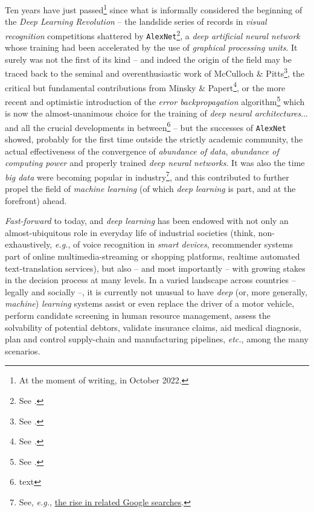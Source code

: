 

Ten years have just passed\footnote{At the moment of writing, in October 2022.} since what is informally considered the beginning of the \textit{Deep Learning Revolution} -- the landslide series of records in \textit{visual recognition} competitions shattered by \texttt{AlexNet}\footnote{See \cite{KrizhevskyEtAl2012AlexNet}.}, a \textit{deep artificial neural network} whose training had been accelerated by the use of \textit{graphical processing units}. It surely was not the first of its kind -- and indeed the origin of the field may be traced back to the seminal and overenthusiastic work of McCulloch \& Pitts\footnote{See \cite{McCullochPitts1990ALC}.}, the critical but fundamental contributions from Minsky \& Papert\footnote{See \cite{MinskyPapert1969Perceptrons}.}, or the more recent and optimistic introduction of the \textit{error backpropagation} algorithm\footnote{See \cite{RumelhartEtAl1986LearningRB}.} which is now the almost-unanimous choice for the training of \textit{deep neural architectures}... and all the crucial developments in between\footnote{text} -- but the successes of \texttt{AlexNet} showed, probably for the first time outside the strictly academic community, the actual effectiveness of the convergence of \textit{abundance of data}, \textit{abundance of computing power} and properly trained \textit{deep neural networks}. It was also the time \textit{big data} were becoming popular in industry\footnote{See, \textit{e.g.}, \href{https://trends.google.com/trends/explore?date=all\&q=big\%20data,Deep\%20learning}{the rise in related Google searches}.}, and this contributed to further propel the field of \textit{machine learning} (of which \textit{deep learning} is part, and at the forefront) ahead.

\textit{Fast-forward} to today, and \textit{deep learning} has been endowed with not only an almost-ubiquitous role in everyday life of industrial societies (think, non-exhaustively, \textit{e.g.}, of voice recognition in \textit{smart devices}, recommender systems part of online multimedia-streaming or shopping platforms, realtime automated text-translation services), but also -- and most importantly -- with growing stakes in the decision process at many levels. In a varied landscape across countries -- legally and socially --, it is currently not unusual to have \textit{deep} (or, more generally, \textit{machine}) \textit{learning} systems assist or even replace the driver of a motor vehicle, perform candidate screening in human resource management, assess the solvability of potential debtors, validate insurance claims, aid medical diagnosis, plan and control supply-chain and manufacturing pipelines, \textit{etc.}, among the many scenarios.

